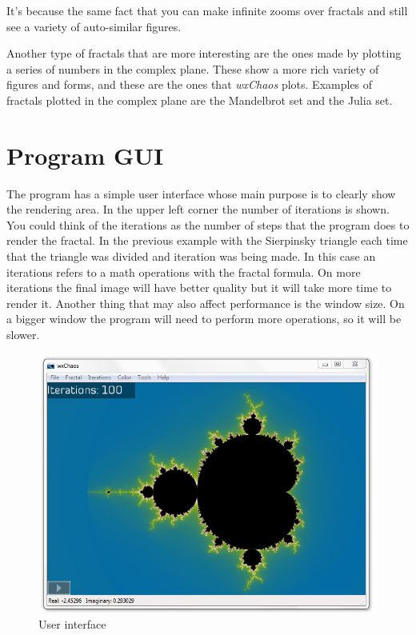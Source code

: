\documentclass[oneside]{book}
\begin{document}
It's because the same fact that you can make infinite zooms over fractals and still see a variety of auto-similar figures.

Another type of fractals that are more interesting are the ones made by plotting a series of numbers in the complex plane. These show a more rich variety of figures and forms, and these are the ones that \textit{wxChaos} plots. Examples of fractals plotted in the complex plane are the Mandelbrot set and the Julia set.

\chapter{Program GUI}
The program has a simple user interface whose main purpose is to clearly show the rendering area. In the upper left corner the number of iterations is shown. You could think of the iterations as the number of steps that the program does to render the fractal. In the previous example with the Sierpinsky triangle each time that the triangle was divided and iteration was being made. In this case an iterations refers to a math operations with the fractal formula. On more iterations the final image will have better quality but it will take more time to render it. Another thing that may also affect performance is the window size. On a bigger window the program will need to perform more operations, so it will be slower.

\begin{figure}[h!]
	\centering
	\includegraphics[scale=0.5]{img/sc1.png}
	\caption{User interface}
	\label{GUI}
\end{figure}
\end{document}
